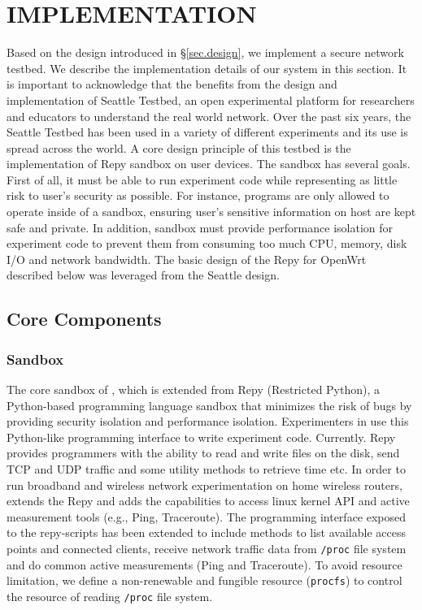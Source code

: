 \chapter{IMPLEMENTATION} 
\label{sec.implementation}
Based on the design introduced in \S{\ref{sec.design}}, we implement a 
secure network testbed. We describe the implementation details of our system 
in this section. It is important to acknowledge that the \sysname benefits from the design and implementation of Seattle Testbed, an open experimental platform for researchers and educators to understand the real world network. Over the past six years, the Seattle Testbed has been used in a variety of different experiments and its use is spread across the world. A core design principle of this testbed is the implementation of Repy sandbox on user devices. The sandbox has several goals. First of all, it must be able to run experiment code while representing as little risk to user's security as possible. For instance, programs are only allowed to operate inside of a sandbox, ensuring user's sensitive information on host are kept safe and private. In addition, sandbox must provide performance isolation for experiment code to prevent them from consuming too much CPU, memory, disk I/O and network bandwidth. The basic design of the Repy for OpenWrt described below was leveraged from the Seattle design.

\section{Core Components}
\subsection{Sandbox}
\label{sec.sandbox}
The core sandbox of \sandboxname, which is extended from Repy (Restricted Python), a Python-based programming language sandbox that minimizes the risk of bugs by providing security isolation and performance isolation. Experimenters in \sysname use this Python-like programming interface to write experiment code. Currently. Repy provides programmers with the ability to read and write files on the disk, send TCP and UDP traffic and some utility methods to retrieve time etc. In order to run broadband and wireless network experimentation on home wireless routers, \sysname extends the Repy and adds the capabilities to access linux kernel API and active measurement tools (e.g., Ping, Traceroute). The programming interface exposed to the repy-scripts has been extended to include methods to list available access points and connected clients, receive network traffic data from \texttt{/proc} file system and do common active measurements (Ping and Traceroute). To avoid resource limitation, we define a non-renewable and fungible resource\cite{li2015fence} (\texttt{procfs}) to control the resource of reading \texttt{/proc} file system. 

